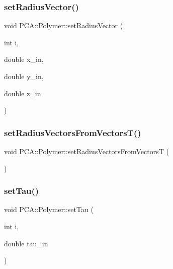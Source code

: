 \hypertarget{class_p_c_a_1_1_polymer_a0c6e93aa35271b98d92a38afd2b0913d}{}\label{class_p_c_a_1_1_polymer_a0c6e93aa35271b98d92a38afd2b0913d} 
\subsubsection{\texorpdfstring{set\+Radius\+Vector()}{setRadiusVector()}}
{\footnotesize\ttfamily void P\+C\+A\+::\+Polymer\+::set\+Radius\+Vector (\begin{DoxyParamCaption}\item[{int}]{i,  }\item[{double}]{x\+\_\+in,  }\item[{double}]{y\+\_\+in,  }\item[{double}]{z\+\_\+in }\end{DoxyParamCaption})\hspace{0.3cm}{\ttfamily [inline]}}

\hypertarget{class_p_c_a_1_1_polymer_a258f607c38c1a247dd37659b236aa3fa}{}\label{class_p_c_a_1_1_polymer_a258f607c38c1a247dd37659b236aa3fa} 
\subsubsection{\texorpdfstring{set\+Radius\+Vectors\+From\+Vectors\+T()}{setRadiusVectorsFromVectorsT()}}
{\footnotesize\ttfamily void P\+C\+A\+::\+Polymer\+::set\+Radius\+Vectors\+From\+VectorsT (\begin{DoxyParamCaption}{ }\end{DoxyParamCaption})}

\hypertarget{class_p_c_a_1_1_polymer_a4ac116507767651444c852a75ab79c2d}{}\label{class_p_c_a_1_1_polymer_a4ac116507767651444c852a75ab79c2d} 
\subsubsection{\texorpdfstring{set\+Tau()}{setTau()}}
{\footnotesize\ttfamily void P\+C\+A\+::\+Polymer\+::set\+Tau (\begin{DoxyParamCaption}\item[{int}]{i,  }\item[{double}]{tau\+\_\+in }\end{DoxyParamCaption})\hspace{0.3cm}{\ttfamily [inline]}}

